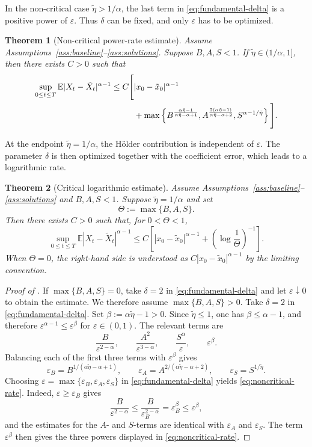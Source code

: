\documentclass[11pt]{article}
\newtheorem{theorem}{Theorem}[section]
\newcommand{\E}{\mathbb{E}}
\newcommand{\1}{\mathbf{1}}
\newcommand{\wt}{\tilde}
\newcommand{\eps}{\varepsilon}
\begin{document}
In the non-critical case $\wt\eta>1/\alpha$, the last term in \eqref{eq:fundamental-delta} is a positive power of $\eps$. Thus $\delta$ can be fixed, and only $\eps$ has to be optimized.

\begin{theorem}[Non-critical power-rate estimate]\label{thm:noncritical}
Assume Assumptions~\ref{ass:baseline}--\ref{ass:solutions}. Suppose $B,A,S<1$.
If $\wt\eta\in(1/\alpha,1]$, then there exists $C>0$ such that
\begin{align}
\sup_{0\le t\le T}\E|X_t-\wt X_t|^{\alpha-1}
\le C\Bigg[&|x_0-\wt x_0|^{\alpha-1} \notag\\
&+\max\left\{
B^{\frac{\alpha\wt\eta-1}{\alpha\wt\eta-\alpha+1}},
A^{\frac{2(\alpha\wt\eta-1)}{\alpha\wt\eta-\alpha+2}},
S^{\alpha-1/\wt\eta}
\right\}\Bigg]. \label{eq:noncritical-rate}
\end{align}
\end{theorem}

At the endpoint $\wt\eta=1/\alpha$, the H\"older contribution is independent of $\eps$. The parameter $\delta$ is then optimized together with the coefficient error, which leads to a logarithmic rate.

\begin{theorem}[Critical logarithmic estimate]\label{thm:critical}
Assume Assumptions~\ref{ass:baseline}--\ref{ass:solutions} and $B,A,S<1$. Suppose $\wt\eta=1/\alpha$ and set
\[
  \Theta:=\max\{B,A,S\}.
\]
Then there exists $C>0$ such that, for $0<\Theta<1$,
\begin{equation}\label{eq:critical-rate}
\sup_{0\le t\le T}\E|X_t-\wt X_t|^{\alpha-1}
\le C\left[|x_0-\wt x_0|^{\alpha-1}+\left(\log\frac1\Theta\right)^{-1}\right].
\end{equation}
When $\Theta=0$, the right-hand side is understood as $C|x_0-\wt x_0|^{\alpha-1}$ by the limiting convention.
\end{theorem}

\begin{proof}[Proof of ]
If $\max\{B,A,S\}=0$, take $\delta=2$ in \eqref{eq:fundamental-delta} and let $\eps\downarrow0$ to obtain the estimate. We therefore assume $\max\{B,A,S\}>0$. Take $\delta=2$ in \eqref{eq:fundamental-delta}. Set $\beta:=\alpha\wt\eta-1>0$. Since $\wt\eta\le1$, one has $\beta\le\alpha-1$, and therefore $\eps^{\alpha-1}\le\eps^\beta$ for $\eps\in(0,1)$. The relevant terms are
\[
  \frac{B}{\eps^{2-\alpha}},\qquad
  \frac{A^2}{\eps^{3-\alpha}},\qquad
  \frac{S^\alpha}{\eps},\qquad
  \eps^\beta.
\]
Balancing each of the first three terms with $\eps^\beta$ gives
\[
  \eps_B=B^{1/(\alpha\wt\eta-\alpha+1)},\qquad
  \eps_A=A^{2/(\alpha\wt\eta-\alpha+2)},\qquad
  \eps_S=S^{1/\wt\eta}.
\]
Choosing $\eps=\max\{\eps_B,\eps_A,\eps_S\}$ in \eqref{eq:fundamental-delta} yields \eqref{eq:noncritical-rate}. Indeed, $\eps\ge\eps_B$ gives
\[
  \frac{B}{\eps^{2-\alpha}}\le \frac{B}{\eps_B^{2-\alpha}}=\eps_B^\beta\le \eps^\beta,
\]
and the estimates for the $A$- and $S$-terms are identical with $\eps_A$ and $\eps_S$. The term $\eps^\beta$ then gives the three powers displayed in \eqref{eq:noncritical-rate}.
\end{proof}
\end{document}
